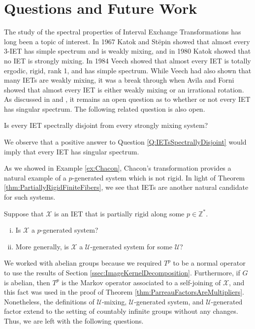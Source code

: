\documentclass[graybox]{svmult}
\theoremstyle{definition}
\begin{document}
\section{Questions and Future Work}\label{sec:Questions}
The study of the spectral properties of Interval Exchange Transformations has long been a topic of interest.
In 1967 Katok and St{\"e}pin \cite{ApproximationsInErgodicTheory} showed that almost every 3-IET has simple spectrum and is weakly mixing, and in 1980 Katok \cite{IETsAreNotMixing} showed that no IET is strongly mixing.
In 1984 Veech \cite{MetricTheoryOfIETs1} showed that almost every IET is totally ergodic, rigid, rank 1, and has simple spectrum.
While Veech had also shown that many IETs are weakly mixing, it was a break through when Avila and Forni \cite{AEIETIsWM} showed that almost every IET is either weakly mixing or an irrational rotation.
As discussed in \cite[Page 15]{Lemanczyk2009Spectral} and \cite{WMBddedCutParameter}, it remains an open question as to whether or not every IET has singular spectrum. 
The following related question is also open.

\begin{question}\label{Q:IETsSpectrallyDisjoint}
    Is every IET spectrally disjoint from every strongly mixing system?
\end{question}

We observe that a positive answer to Question \ref{Q:IETsSpectrallyDisjoint} would imply that every IET has singular spectrum.

As we showed in Example \ref{ex:Chacon}, Chacon's transformation provides a natural example of a $p$-generated system which is not rigid.  
In light of Theorem \ref{thm:PartiallyRigidFiniteFibers}, we see that IETs are another natural candidate for such systems.
\begin{question}\label{Q:AreIETsParreau}
    Suppose that $\mathcal{X}$ is an IET that is partially rigid along some $p \in \mathbb{Z}^*$.
    \begin{enumerate}[(i)]
        \item Is $\mathcal{X}$ a $p$-generated system?

        \item More generally, is $\mathcal{X}$ a ${\mathcal{U}}$-generated system for some ${\mathcal{U}}$?
    \end{enumerate}
\end{question}

We worked with abelian groups because we required $T^p$ to be a normal operator to use the results of Section \ref{ssec:ImageKernelDecomposition}.
Furthermore, if $G$ is abelian, then $T^p$ is the Markov operator associated to a self-joining of $\mathcal{X}$, and this fact was used in the proof of Theorem \ref{thm:ParreauFactorsAreMultipliers}.
Nonetheless, the definitions of $\mathcal{U}$-mixing, $\mathcal{U}$-generated system, and $\mathcal{U}$-generated factor extend to the setting of countably infinite groups without any changes. 
Thus, we are left with the following questions.
\end{document}
